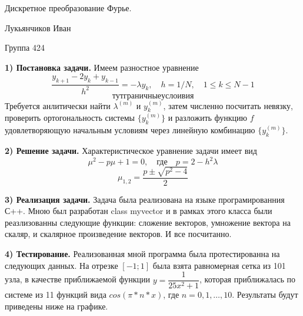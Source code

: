 \documentclass[12pt,a4paper]{scrartcl}
\begin{document}
\begin{titlepage}
\begin{center}
\large

Дискретное преобразование Фурье.

\end{center}
\vfill
\begin{flushright}
Лукьянчиков Иван

Группа 424
\end{flushright}
\end{titlepage}
\textbf{1) Постановка задачи.}
Имеем разностное уравнение
$$\dfrac{y_{k+1}-2y_{k}+y_{k-1}}{h^2}=-\lambda y_k, \quad h=1/N, \quad 1 \leqslant k \leqslant N-1$$
$$тут граничные услоивия$$
Требуется анлитически найти $\lambda^{(m)}$ и $y_k^{(m)}$, затем численно посчитать невязку, проверить ортогональность системы $\{y_k^{(m)}\}$ и разложить функцию $f$ удовлетворяющую начальным условиям через линейную комбинацию $\{y_k^{(m)}\}$.

\textbf{2) Решение задачи.}
Характеристическое уравнение задачи имеет вид
$$\mu^2 - p\mu + 1 = 0, \quad \text{где} \quad  p=2 - h^2 \lambda$$
$$\mu_{1,2} = \dfrac{p \pm \sqrt{p^2 - 4}}{2}$$

\textbf{3) Реализация задачи.}
Задача была реализована на языке програмированния С++. Мною был разработан class myvector и в рамках этого класса были реазлизованны следующие функции: сложение векторов, умножение вектора на скаляр, и скалярное произведение векторов. И все посчитанно.

\textbf{4) Тестирование.}
Реализованная мной программа была протестированна на следующих данных. На отрезке $[-1;1]$ была взята равномерная сетка из 101 узла, в качестве приближаемой функции $y=\dfrac{1}{25x^2+1}$, которая приближалась по системе из 11 функций вида $cos(\pi*n*x)$, где $n=0,1,\dots,10$. Результаты будут приведены ниже на графике.
\end{document}
